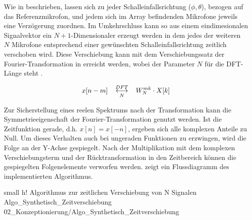 Wie in  beschrieben, lassen sich zu jeder Schalleinfallsrichtung ($\phi, \theta$), bezogen auf das Referenzmikrofon, und jedem sich im Array befindenden Mikrofone jeweils eine Verzögerung zuordnen. Im Umkehrschluss kann so aus einem eindimesionalen Signalvektor ein $N+1$-Dimensionaler erzeugt werden in dem jedes der weiteren $N$ Mikrofone entsprechend einer gewünschten Schalleinfallsrichtung zeitlich verschoben wird. Diese Verschiebung kann mit dem Verschiebungssatz der Fourier-Transformation in  erreicht werden, wobei der Parameter $N$ für die DFT-Länge steht \cite[S. 213]{Book_SigSys_Werner}.

\begin{equation}\label{eq:DFT_Verschiebung}
  x[n-m] \hspace{0.3cm} \overset{DFT}{\underset{N}{\longleftrightarrow}} \hspace{0.3cm} W^{mk}_N \cdot X[k]
\end{equation}

Zur Sicherstellung eines reelen Spektrums nach der Transformation kann die Symmetrieeigenschaft der Fourier-Transformation genutzt werden. Ist die Zeitfunktion gerade, d.h. $x[n] = x[-n]$, ergeben sich alle komplexen Anteile zu Null. Um dieses Verhalten auch bei ungeraden Funktionen zu erzwingen, wird die Folge an der Y-Achse gespiegelt. Nach der Multiplikation mit dem komplexen Verschiebungsterm und der Rücktransformation in den Zeitbereich können die gespiegelten Folgenelemente verworfen werden.  zeigt ein Flussdiagramm des implementierten Algorithmus. 




         {small}                 %
         {h!}             %
         {Algorithmus zur zeitlichen Verschiebung von N Signalen}                %
         {Algo_Synthetisch_Zeitverschiebung}                %
         {02_Konzeptionierung/Algo_Synthetisch_Zeitverschiebung}     %




